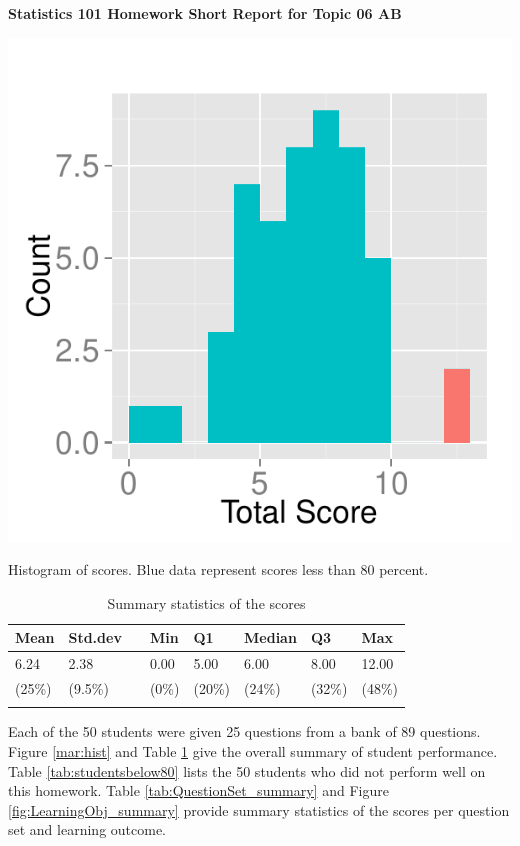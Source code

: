 \documentclass[12pt,english,nohyper]{tufte-handout}\usepackage[]{graphicx}\usepackage[]{color}
\begin{document}
\centerline{\Large\bf Statistics 101 Homework Short Report for Topic 06 AB}
\vspace{1cm}

\begin{marginfigure}
\includegraphics[width=0.98\linewidth]{Topic06_AB_score}
\caption{\label{mar:hist}Histogram of scores. Blue data represent scores less than 80 percent.}
\end{marginfigure}

\begin{longtable}{llllllll}
  \hline
Mean & Std.dev &   & Min & Q1 & Median & Q3 & Max \\ 
  \hline
6.24 & 2.38 &  & 0.00 & 5.00 & 6.00 & 8.00 & 12.00 \\ 
  (25\%) & (9.5\%) &  & (0\%) & (20\%) & (24\%) & (32\%) & (48\%) \\ 
   \hline
\hline
\caption{Summary statistics of the scores} 
\label{tab:summary}
\end{longtable}




\newif\ifPositive

\Positivetrue

\ifPositive
Each of the 50 students were given 25 questions from a bank of 89 questions. Figure \ref{mar:hist} and Table \ref{tab:summary} give the overall summary of student performance. Table \ref{tab:studentsbelow80} lists the 50 students who did not perform well on this homework. Table \ref{tab:QuestionSet_summary} and Figure \ref{fig:LearningObj_summary} provide summary statistics of the scores per question set and learning outcome.
\else
Each of the 50 students were given 25 questions from a bank of 89 questions. Figure \ref{mar:hist} and Table \ref{tab:summary} give the overall summary of student performance. Table \ref{tab:QuestionSet_summary} and Figure \ref{fig:LearningObj_summary} provide summary statistics of the scores per question set and learning outcome.
\fi
\end{document}
